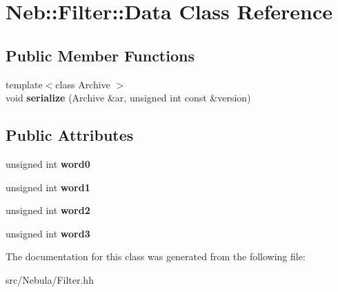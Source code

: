 \hypertarget{classNeb_1_1Filter_1_1Data}{\section{Neb\-:\-:Filter\-:\-:Data Class Reference}
\label{classNeb_1_1Filter_1_1Data}
}
\subsection*{Public Member Functions}
\begin{DoxyCompactItemize}
\item 
\hypertarget{classNeb_1_1Filter_1_1Data_a727a2c1fa8011f050ada6e871230b585}{{\footnotesize template$<$class Archive $>$ }\\void {\bfseries serialize} (Archive \&ar, unsigned int const \&version)}\label{classNeb_1_1Filter_1_1Data_a727a2c1fa8011f050ada6e871230b585}

\end{DoxyCompactItemize}
\subsection*{Public Attributes}
\begin{DoxyCompactItemize}
\item 
\hypertarget{classNeb_1_1Filter_1_1Data_a4c58a7b73274baec2618f3aaa658737e}{unsigned int {\bfseries word0}}\label{classNeb_1_1Filter_1_1Data_a4c58a7b73274baec2618f3aaa658737e}

\item 
\hypertarget{classNeb_1_1Filter_1_1Data_a53392967cf835071bf2bb34fa96dcf1c}{unsigned int {\bfseries word1}}\label{classNeb_1_1Filter_1_1Data_a53392967cf835071bf2bb34fa96dcf1c}

\item 
\hypertarget{classNeb_1_1Filter_1_1Data_a32ac663d2a72a3c1f3e97dd329c0db5c}{unsigned int {\bfseries word2}}\label{classNeb_1_1Filter_1_1Data_a32ac663d2a72a3c1f3e97dd329c0db5c}

\item 
\hypertarget{classNeb_1_1Filter_1_1Data_a5e0caefa84858430a4456fcd381cb537}{unsigned int {\bfseries word3}}\label{classNeb_1_1Filter_1_1Data_a5e0caefa84858430a4456fcd381cb537}

\end{DoxyCompactItemize}


The documentation for this class was generated from the following file\-:\begin{DoxyCompactItemize}
\item 
src/\-Nebula/Filter.\-hh\end{DoxyCompactItemize}
